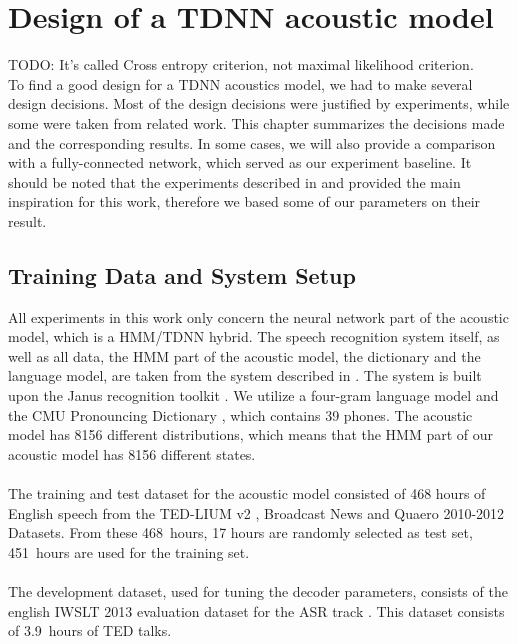 

\chapter{Design of a TDNN acoustic model}
\label{ch:tdnn_design}
TODO: It's called Cross entropy criterion, not maximal likelihood criterion. \\
To find a good design for a TDNN acoustics model, we had to make several design decisions. Most of the design decisions were justified by experiments, while some were taken from related work. This chapter summarizes the decisions made and the corresponding results. In some cases, we will also provide a comparison with a fully-connected network, which served as our experiment baseline. It should be noted that the experiments described in \cite{peddinti2015jhu} and \cite{peddinti2015reverberation} provided the main inspiration for this work, therefore we based some of our parameters on their result. \\ 
\section{Training Data and System Setup}
All experiments in this work only concern the neural network part of the acoustic model, which is a HMM/TDNN hybrid. The speech recognition system itself, as well as all data, the HMM part of the acoustic model, the dictionary and the language model, are taken from the system described in \cite{nguyen20162016}. The system is built upon the Janus recognition toolkit \cite{finke1997karlsruhe}. We utilize a four-gram language model and the CMU Pronouncing Dictionary \cite{cmudict}, which contains 39 phones. The acoustic model has 8156 different distributions, which means that the HMM part of our acoustic model has 8156 different states. \\ \\
The training and test dataset for the acoustic model consisted of 468 hours of English speech from the TED-LIUM v2 \cite{rousseau2014enhancing}, Broadcast News \cite{graff19971996} and Quaero 2010-2012 Datasets. From these 468~hours, 17 hours are randomly selected as test set, 451~hours are used for the training set. \\ \\
The development dataset, used for tuning the decoder parameters, consists of the english IWSLT 2013 evaluation dataset for the ASR track \cite{cettolo2013report}. This dataset consists of 3.9~hours of TED talks. 

